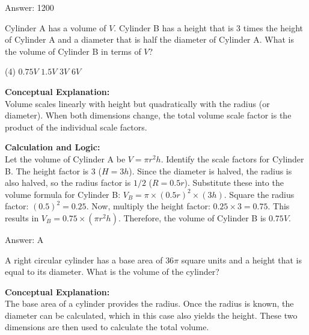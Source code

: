 \documentclass[11pt,paper=a4,answers]{exam}
\begin{document}
\begin{questions}
\begin{solution}
\vspace{30pt}

Answer: \colorbox{yellow!100}{1200}
\end{solution}

\vspace{60pt}

\question
Cylinder A has a volume of $V$. Cylinder B has a height that is 3 times the height of Cylinder A and a diameter that is half the diameter of Cylinder A. What is the volume of Cylinder B in terms of $V$?
\begin{tasks}(4)
    \task $0.75V$
    \task $1.5V$
    \task $3V$
    \task $6V$
\end{tasks}

\begin{solution}
\textbf{Conceptual Explanation:} \\
Volume scales linearly with height but quadratically with the radius (or diameter). When both dimensions change, the total volume scale factor is the product of the individual scale factors.

\vspace{30pt}

\textbf{Calculation and Logic:} \\
Let the volume of Cylinder A be $V = \pi r^2 h$. Identify the scale factors for Cylinder B. The height factor is 3 ($H = 3h$). Since the diameter is halved, the radius is also halved, so the radius factor is $1/2$ ($R = 0.5r$). Substitute these into the volume formula for Cylinder B: $V_B = \pi \times (0.5r)^2 \times (3h)$. Square the radius factor: $(0.5)^2 = 0.25$. Now, multiply the height factor: $0.25 \times 3 = 0.75$. This results in $V_B = 0.75 \times (\pi r^2 h)$. Therefore, the volume of Cylinder B is $0.75V$.

\vspace{30pt}

Answer: \colorbox{yellow!100}{A}
\end{solution}

\vspace{60pt}

\question
A right circular cylinder has a base area of $36\pi$ square units and a height that is equal to its diameter. What is the volume of the cylinder?

\begin{solution}
\textbf{Conceptual Explanation:} \\
The base area of a cylinder provides the radius. Once the radius is known, the diameter can be calculated, which in this case also yields the height. These two dimensions are then used to calculate the total volume.


\end{solution}
\end{questions}
\end{document}
